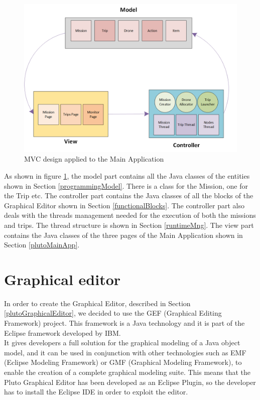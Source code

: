 \begin{figure}[h!]
\includegraphics[width=\linewidth]
{pictures/MVC.png}
\caption{MVC design applied to the Main Application}
\label{fig:mvc}
\end{figure}

As shown in figure \ref{fig:mvc}, the model part contains all the Java classes of the entities shown in Section \ref{programmingModel}.
There is a class for the Mission, one for the Trip etc.
The controller part contains the Java classes of all the blocks of the Graphical Editor shown in Section \ref{functionalBlocks}.
The controller part also deals with the threads management needed for the execution of both the missions and trips. The thread structure is shown in Section \ref{runtimeMng}.
The view part contains the Java classes of the three pages of the Main Application shown in Section \ref{plutoMainApp}.
\\

\section{Graphical editor}\label{editor}

In order to create the Graphical Editor, described in Section \ref{plutoGraphicalEditor}, we decided to use the GEF (Graphical Editing Framework) project. This framework is a Java technology and it is part of the Eclipse framework developed by IBM.
\\

It gives developers a full solution for the graphical modeling of a Java object model, and it can be used in conjunction with other technologies such as EMF (Eclipse Modeling Framework) or GMF (Graphical Modeling Framework), to enable the creation of a complete graphical modeling suite. 
This means that the Pluto Graphical Editor has been developed as an Eclipse Plugin, so the developer has to install the Eclipse IDE in order to exploit the editor.
\\

